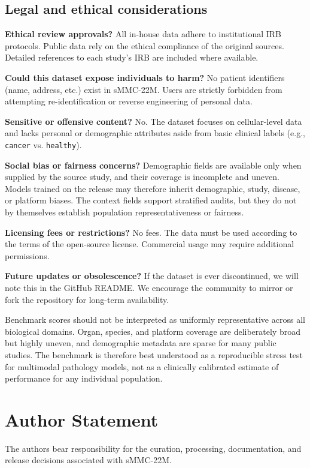 \documentclass[sigconf,review]{acmart}
\newcommand{\dataset}{sMMC-22M\xspace}
\newcommand{\datasheetq}[1]{\par\noindent\textbf{#1}\enspace}
\begin{document}

\subsection{Legal and ethical considerations}
\datasheetq{Ethical review approvals?}
All in-house data adhere to institutional IRB protocols. Public data rely on the ethical compliance of the original sources. Detailed references to each study’s IRB are included where available.

\datasheetq{Could this dataset expose individuals to harm?}
No patient identifiers (name, address, etc.) exist in \dataset. Users are strictly forbidden from attempting re-identification or reverse engineering of personal data.

\datasheetq{Sensitive or offensive content?}
No. The dataset focuses on cellular-level data and lacks personal or demographic attributes aside from basic clinical labels (e.g., \texttt{cancer} vs. \texttt{healthy}).

\datasheetq{Social bias or fairness concerns?}
Demographic fields are available only when supplied by the source study, and
their coverage is incomplete and uneven. Models trained on the release may
therefore inherit demographic, study, disease, or platform biases. The context
fields support stratified audits, but they do not by themselves establish
population representativeness or fairness.

\datasheetq{Licensing fees or restrictions?}
No fees. The data must be used according to the terms of the open-source license. Commercial usage may require additional permissions.

\datasheetq{Future updates or obsolescence?}
If the dataset is ever discontinued, we will note this in the GitHub README. We encourage the community to mirror or fork the repository for long-term availability.

Benchmark scores should not be interpreted as uniformly representative across all biological domains. Organ, species, and platform coverage are deliberately broad but highly uneven, and demographic metadata are sparse for many public studies. The benchmark is therefore best understood as a reproducible stress test for multimodal pathology models, not as a clinically calibrated estimate of performance for any individual population.

\balance
\section{Author Statement}
\label{sec:author_statement}
\noindent
The authors bear responsibility for the curation, processing, documentation,
and release decisions associated with \dataset.
\end{document}
